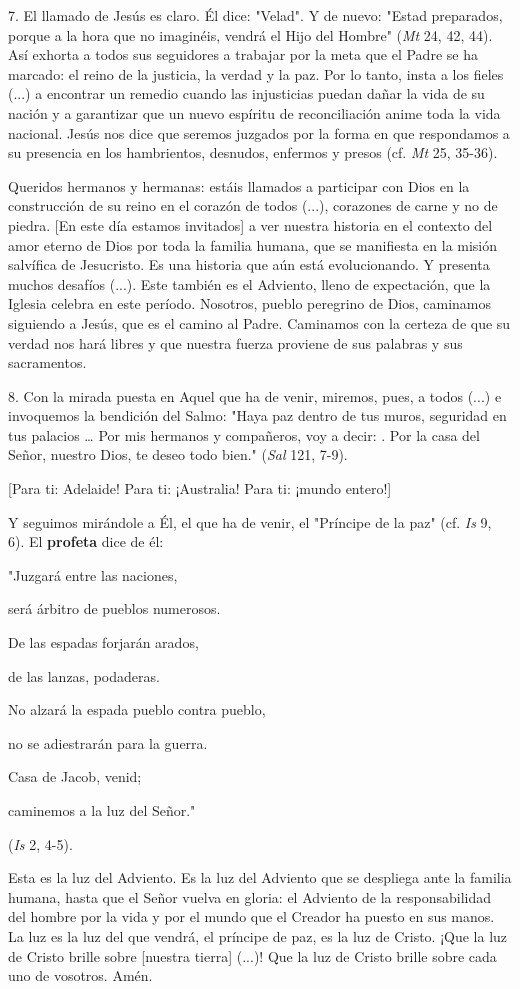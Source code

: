 \begin{body}
	7. El llamado de Jesús es claro. Él dice: "Velad". Y de nuevo: "Estad preparados, porque a la hora que no imaginéis, vendrá el Hijo del Hombre" (\emph{Mt} 24, 42, 44). Así exhorta a todos sus seguidores a trabajar por la meta que el Padre se ha marcado: el reino de la justicia, la verdad y la paz. Por lo tanto, insta a los fieles (...) a encontrar un remedio cuando las injusticias puedan dañar la vida de su nación y a garantizar que un nuevo espíritu de reconciliación anime toda la vida nacional. Jesús nos dice que seremos juzgados por la forma en que respondamos a su presencia en los hambrientos, desnudos, enfermos y presos (cf. \emph{Mt} 25, 35-36).
	
	Queridos hermanos y hermanas: estáis llamados a participar con Dios en la construcción de su reino en el corazón de todos (...), corazones de carne y no de piedra. {[}En este día estamos invitados{]} a ver nuestra historia en el contexto del amor eterno de Dios por toda la familia humana, que se manifiesta en la misión salvífica de Jesucristo. Es una historia que aún está evolucionando. Y presenta muchos desafíos (...). Este también es el Adviento, lleno de expectación, que la Iglesia celebra en este período. Nosotros, pueblo peregrino de Dios, caminamos siguiendo a Jesús, que es el camino al Padre. Caminamos con la certeza de que su verdad nos hará libres y que nuestra fuerza proviene de sus palabras y sus sacramentos.
	
	8. Con la mirada puesta en Aquel que ha de venir, miremos, pues, a todos (...) e invoquemos la bendición del Salmo: "Haya paz dentro de tus muros, seguridad en tus palacios \ldots{} Por mis hermanos y compañeros, voy a decir: . Por la casa del Señor, nuestro Dios, te deseo todo bien." (\emph{Sal} 121, 7-9).
	
	{[}Para ti: Adelaide! Para ti: ¡Australia! Para ti: ¡mundo entero!{]}
	
	Y seguimos mirándole a Él, el que ha de venir, el "Príncipe de la paz" (cf. \emph{Is} 9, 6). El \textbf{profeta} dice de él:
	
	"Juzgará entre las naciones,
	
	será árbitro de pueblos numerosos.
	
	De las espadas forjarán arados,
	
	de las lanzas, podaderas.
	
	No alzará la espada pueblo contra pueblo,
	
	no se adiestrarán para la guerra.
	
	Casa de Jacob, venid;
	
	caminemos a la luz del Señor."
	
	(\emph{Is} 2, 4-5).
	
	Esta es la luz del Adviento. Es la luz del Adviento que se despliega ante la familia humana, hasta que el Señor vuelva en gloria: el Adviento de la responsabilidad del hombre por la vida y por el mundo que el Creador ha puesto en sus manos. La luz es la luz del que vendrá, el príncipe de paz, es la luz de Cristo. ¡Que la luz de Cristo brille sobre {[}nuestra tierra{]} (...)! Que la luz de Cristo brille sobre cada uno de vosotros. Amén. 
\end{body}

